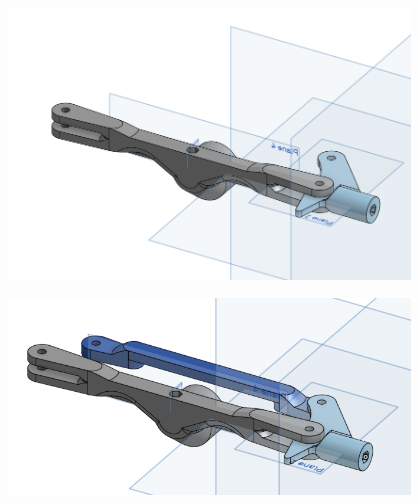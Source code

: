 \begin{figure}[ht]
\begin{minipage}[b]{.48\textwidth}
  \centering
  \includegraphics[width=0.95\textwidth]{Meetings/September/09-28-22/9-28-22_CAD_Figure3.PNG}
  \label{fig:pic2}
\end{minipage}

\begin{minipage}[b]{.48\textwidth}
  \centering
  \includegraphics[width=0.95\textwidth]{Meetings/September/09-28-22/9-28-22_CAD_Figure4.PNG}
  \label{fig:pic2}
\end{minipage}
\end{figure}

